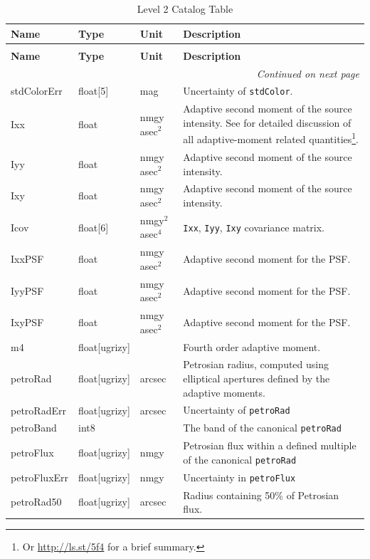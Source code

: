 \documentclass[SE,lsstdraft,toc]{lsstdoc}
\newcommand{\oldtext}[1]{{\color{red} #1}}
\newenvironment{schema}[3]{%
\setlength\LTleft{0pt}
\setlength\LTright{\fill}
\begin{longtable}{p{0.2\textwidth}p{0.14\textwidth}p{0.14\textwidth}p{0.41\textwidth}}

\caption[#1]{#2\label{#3}}\\

\hline \textbf{Name} & \textbf{Type} & \textbf{Unit} & \textbf{Description}\\ \hline
\endfirsthead

\caption[#1]{#2}\\

\hline \textbf{Name} & \textbf{Type} & \textbf{Unit} & \textbf{Description}\\ \hline
\endhead

\hline \multicolumn{4}{r}{\emph{Continued on next page}} \\
\endfoot

\hline\hline
\endlastfoot
}{%
\hline
\end{longtable}
}
\begin{document}
\begin{schema}{\Object Table}{Level 2 Catalog \Object Table}{tbl:objectTable}
stdColorErr & float[5] & mag & Uncertainty of \texttt{stdColor}. \\

Ixx & float & \oldtext{nmgy} asec$^{2}$ & Adaptive second moment of the source intensity. See \citet{2002AJ....123..583B} for detailed discussion of all adaptive-moment related quantities\footnote{Or \url{http://ls.st/5f4} for a brief summary.}. \\

Iyy & float & \oldtext{nmgy} asec$^{2}$ & Adaptive second moment of the source intensity. \\

Ixy & float & \oldtext{nmgy} asec$^{2}$ & Adaptive second moment of the source intensity. \\

Icov & float[6] & \oldtext{nmgy$^{2}$} asec$^{4}$ & \texttt{Ixx}, \texttt{Iyy}, \texttt{Ixy} covariance matrix. \\

IxxPSF & float & \oldtext{nmgy} asec$^{2}$ & Adaptive second moment for the PSF. \\

IyyPSF & float & \oldtext{nmgy} asec$^{2}$ & Adaptive second moment for the PSF. \\

IxyPSF & float & \oldtext{nmgy} asec$^{2}$ & Adaptive second moment for the PSF. \\

m4 & float[ugrizy] & ~ & Fourth order adaptive moment. \\


petroRad & float[ugrizy] & arcsec & Petrosian radius, computed using elliptical apertures defined by the adaptive moments. \\

petroRadErr & float[ugrizy] & arcsec & Uncertainty of \texttt{petroRad} \\

petroBand & int8 & ~ & The band of the canonical \texttt{petroRad} \\

petroFlux & float[ugrizy] & nmgy & Petrosian flux within a defined multiple of the canonical \texttt{petroRad} \\

petroFluxErr & float[ugrizy] & nmgy & Uncertainty in \texttt{petroFlux} \\

petroRad50 & float[ugrizy] & arcsec & Radius containing 50\% of Petrosian flux. \\


\end{schema}
\end{document}
